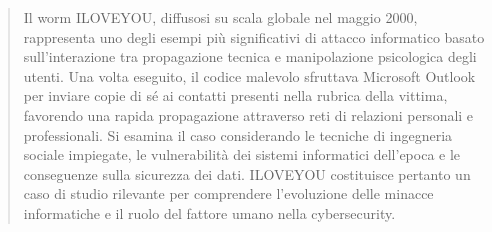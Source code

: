 \begin{abstract}
    Il worm ILOVEYOU, diffusosi su scala globale nel maggio 2000, rappresenta uno degli esempi più significativi di attacco informatico basato sull'interazione tra propagazione tecnica e manipolazione psicologica degli utenti. 
    Una volta eseguito, il codice malevolo sfruttava Microsoft Outlook per inviare copie di sé ai contatti presenti nella rubrica della vittima, favorendo una rapida propagazione attraverso reti di relazioni personali e professionali. 
    Si esamina il caso considerando le tecniche di ingegneria sociale impiegate, le vulnerabilità dei sistemi informatici dell'epoca e le conseguenze sulla sicurezza dei dati.
    ILOVEYOU costituisce pertanto un caso di studio rilevante per comprendere l'evoluzione delle minacce informatiche e il ruolo del fattore umano nella cybersecurity.
\end{abstract}